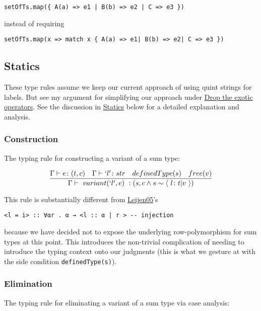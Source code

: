 \documentclass[11pt]{article}
\begin{document}
\begin{verbatim}
setOfTs.map({ A(a) => e1 | B(b) => e2 | C => e3 })
\end{verbatim}

instead of requiring

\begin{verbatim}
setOfTs.map(x => match x { A(a) => e1| B(b) => e2| C => e3 })
\end{verbatim}

\subsection{Statics}
\label{sec:org248a521}
These type rules assume we keep our current approach of using quint
strings for labels. But see my argument for simplifying our approach
under \hyperref[sec:org5370d96]{Drop the exotic operators}. See the
discussion in \hyperref[sec:org01c8751]{Statics} below for a detailed explanation and
analysis.

\subsubsection{Construction}
\label{sec:org7e71f1a}
The typing rule for constructing a variant of a sum type:

$$
\frac
{
\Gamma \vdash e \colon (t, c) \quad
\Gamma \vdash `l' \colon str \quad
definedType(s) \quad
free(v)
}
{
\Gamma \vdash \ variant(`l', e) \ :
(s, c \land s \sim \langle \ l \colon t | v \ \rangle)
}
$$


This rule is substantially different from \href{https://www.microsoft.com/en-us/research/publication/extensible-records-with-scoped-labels/}{Leijen05}'s

\begin{verbatim}
<l = i> :: ∀αr . α → <l :: α | r > -- injection
\end{verbatim}


because we have decided not to expose the underlying row-polymorphism for sum
types at this point. This introduces the non-trivial complication of needing to
introduce the typing context onto our judgments (this is what we gesture at with
the side condition \texttt{definedType(s)}).

\subsubsection{Elimination}
\label{sec:orgc1190ae}

The typing rule for eliminating a variant of a sum type via case
analysis:
\end{document}
